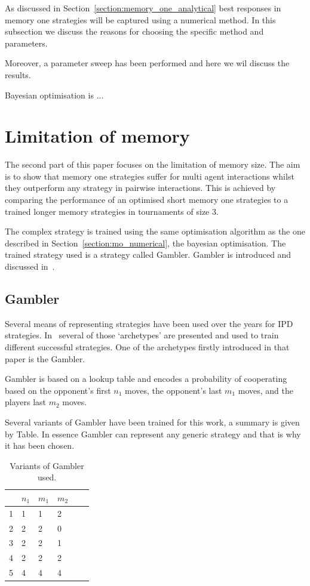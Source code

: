 \documentclass[10pt]{article}
\begin{document}
As discussed in Section~\ref{section:memory_one_analytical} best responses in memory
one strategies will be captured using a numerical method. In this
subsection we discuss the reasons for choosing the specific method and parameters.

Moreover, a parameter sweep has been performed and here we wil discuss the results.

Bayesian optimisation is ...

\section{Limitation of memory}

The second part of this paper focuses on the limitation of memory size.
The aim is to show that memory one strategies suffer for multi agent interactions
whilst they outperform any strategy in pairwise interactions. This is achieved by
comparing the performance of an optimised short memory one strategies to a trained
longer memory strategies in tournaments of size 3.

The complex strategy is trained using the same optimisation algorithm
as the one described in Section~\ref{section:mo_numerical}, the bayesian
optimisation. The trained strategy used is a strategy called Gambler.
Gambler is introduced and discussed in~\cite{Harper2017}.

\subsection{Gambler}

Several means of representing strategies have been used over the years for
IPD strategies. In~\cite{Harper2017} several of those `archetypes' are presented
and used to train different successful strategies. One of the archetypes firstly
introduced in that paper is the Gambler.

Gambler is based on a lookup table and encodes a probability of cooperating
based on the opponent's first \(n_1\) moves, the opponent's last \(m_1\) moves,
and the players last \(m_2\) moves.

Several variants of Gambler have been trained for this work, a summary is given
by Table. In essence Gambler can represent any generic strategy and that is
why it has been chosen.

\begin{table}[htbp]
\begin{center}
\begin{tabular}{clllll}
    \toprule
    {}&  \(n_1\) & \(m_1\) & \(m_2\)\\
    \midrule
    1 & 1 & 1 & 2\\
    2 & 2 & 2 & 0\\
    3 & 2 & 2 & 1\\
    4 & 2 & 2 & 2\\
    5 & 4 & 4 & 4\\
    \bottomrule
\end{tabular}
\end{center}
\caption{Variants of Gambler used.}
\label{table:gambler}
\end{table}
\end{document}
